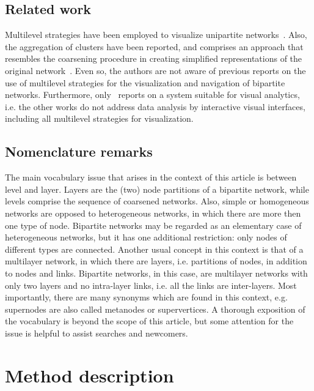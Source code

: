 \documentclass[runningheads]{llncs}
\begin{document}
\subsection{Related work}\label{rel}
Multilevel strategies have been employed to visualize unipartite networks~\cite{u1,u2,u3,u4,u5,u6,u7}.
Also, the aggregation of clusters have been reported, and comprises an approach that resembles
the coarsening procedure in creating simplified representations of the original network~\cite{a1,a2,a3,a4,a5,a6}.
Even so, the authors are not aware of previous reports on the use of multilevel strategies
for the visualization and navigation of bipartite networks.
Furthermore, only~\cite{a1,a2,a3,a4,a6} reports on a system suitable for visual analytics, i.e. the other works do not
address data analysis by interactive visual interfaces, including all multilevel strategies for visualization.

\subsection{Nomenclature remarks}\label{nom}
The main vocabulary issue that arises in the context of this article is between
level and layer. Layers are the (two) node partitions of a bipartite network, while levels comprise the sequence
of coarsened networks.
Also, simple or homogeneous networks are opposed to heterogeneous networks, in which there
are more then one type of node.
Bipartite networks may be regarded as an elementary case of heterogeneous networks,
but it has one additional restriction: only nodes of different types are connected.
Another usual concept in this context is that of a multilayer network, in which there are layers,
i.e. partitions of nodes, in addition to nodes and links.
Bipartite networks, in this case, are multilayer networks with only two layers and no intra-layer links, i.e. all the links are inter-layers.
Most importantly, there are many synonyms which are found in this context, e.g. supernodes are also called metanodes or supervertices.
A thorough exposition of the vocabulary is beyond the scope of this article, but
some attention for the issue is helpful to assist searches and newcomers.

\section{Method description}\label{des}
\end{document}
